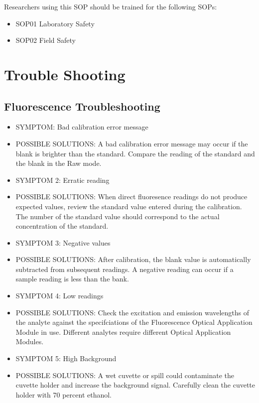 \documentclass[12pt]{../SOP3_beta}
\begin{document}
\NP Researchers using this SOP should be trained for the following SOPs:

\begin{itemize}
  \item SOP01 Laboratory Safety
  \item SOP02 Field Safety
\end{itemize}

\section{Trouble Shooting}
\subsection{Fluorescence Troubleshooting}
\begin{itemize}
  \item SYMPTOM: Bad calibration error message
  \item POSSIBLE SOLUTIONS: A bad calibration error message may occur if the blank is brighter than the standard. Compare the reading of the standard and the blank in the Raw mode. 
  \item SYMPTOM 2: Erratic reading
  \item POSSIBLE SOLUTIONS: When direct fluoresence readings do not produce expected values, review the standard value entered during the calibration. The number of the standard value should correspond to the actual concentration of the standard.
  \item SYMPTOM 3: Negative values
  \item POSSIBLE SOLUTIONS: After calibration, the blank value is automatically subtracted from subsequent readings. A negative reading can occur if a sample reading is less than the bank.
  \item SYMPTOM 4: Low readings
  \item POSSIBLE SOLUTIONS: Check the excitation and emission wavelengths of the analyte against the specifciations of the Fluorescence Optical Application Module in use. Different analytes require different Optical Application Modules.
  \item SYMPTOM 5: High Background
  \item POSSIBLE SOLUTIONS: A wet cuvette or spill could contaminate the cuvette holder and increase the background signal. Carefully clean the cuvette holder with 70 percent ethanol. 
\end{itemize}
\end{document}
